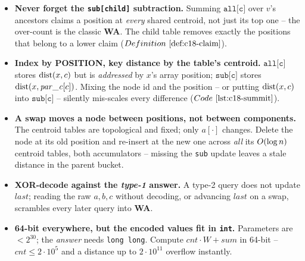 \begin{hardeningbox}
\begin{itemize}[nosep,leftmargin=1.4em]
  \item \textbf{Never forget the \texttt{sub[child]} subtraction.} Summing \(\texttt{all[c]}\) over
        \(v\)'s ancestors claims a position at \emph{every} shared centroid, not just its top one --
        the over-count is the classic \textbf{WA}. The child table removes exactly the positions that
        belong to a lower claim (\(\defref{c18-claim}\)).
  \item \textbf{Index by POSITION, key distance by the table's centroid.} \(\texttt{all[c]}\) stores
        \(\operatorname{dist}(x,c)\) but is \emph{addressed} by \(x\)'s array position; \(\texttt{sub[c]}\) stores
        \(\operatorname{dist}(x,\mathit{par\_c}[c])\). Mixing the node id and the position -- or putting
        \(\operatorname{dist}(x,c)\) into \(\texttt{sub[c]}\) -- silently mis-scales every difference
        (\(\coderef{c18-summit}\)).
  \item \textbf{A swap moves a node between positions, not between components.} The centroid tables
        are topological and fixed; only \(a[\cdot]\) changes. Delete the node at its old position and
        re-insert at the new one across \emph{all} its \(O(\log n)\) centroid tables, both
        accumulators -- missing the \texttt{sub} update leaves a stale distance in the parent bucket.
  \item \textbf{XOR-decode against the \emph{type-1} answer.} A type-2 query does not update
        \(\mathit{last}\); reading the raw \(a,b,c\) without decoding, or advancing \(\mathit{last}\)
        on a swap, scrambles every later query into \textbf{WA}.
  \item \textbf{64-bit everywhere, but the encoded values fit in \texttt{int}.} Parameters are
        \(<2^{30}\); the \emph{answer} needs \texttt{long long}. Compute \(\mathit{cnt}\cdot W + \mathit{sum}\)
        in 64-bit -- \(\mathit{cnt}\le 2\cdot10^5\) and a distance up to \(2\cdot10^{11}\) overflow
         instantly.
\end{itemize}
\end{hardeningbox}

